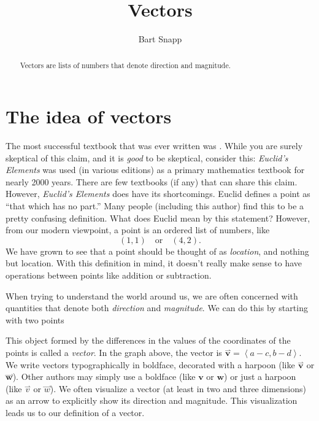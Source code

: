 \documentclass{ximera}
\author{Bart Snapp}
\title[Dig-In:]{Vectors}
\begin{document}
\begin{abstract}
  Vectors are lists of numbers that denote direction and magnitude.
\end{abstract}
\maketitle


\section{The idea of vectors}

The most successful textbook that was ever written was
. While
you are surely skeptical of this claim, and it is \textit{good} to be
skeptical, consider this: \textit{Euclid's Elements} was used (in
various editions) as a primary mathematics textbook for nearly 2000
years. There are few textbooks (if any) that can share this
claim. However, \textit{Euclid's Elements} does have its shortcomings. 
Euclid defines a point as ``that which has no part.'' Many people 
(including this author) find this to be 
a pretty confusing definition. What does Euclid mean by this statement? 
However, from our modern viewpoint, a point is an
ordered list of numbers, like
\[
(1,1)\quad\text{or}\quad(4,2).
\]
We have grown to see that a point should be thought of as
\textit{location}, and nothing but location. With this definition in mind, it
doesn't really make sense to have operations between points like
addition or subtraction.

When trying to understand the world around us, we are often concerned
with quantities that denote both \textit{direction} and
\textit{magnitude}. We can do this by starting with two points










This object formed by the differences in the values of the coordinates of the points is 
called a \textit{vector}. In the graph above, the vector is
$\overset{\rightharpoonup}{\mathbf{v}}=\left\langle a-c,b-d \right\rangle$. We write vectors typographically in
boldface, decorated with a harpoon (like $\overset{\rightharpoonup}{\mathbf{v}}$ or
$\overset{\rightharpoonup}{\mathbf{w}}$). Other authors may simply use a boldface (like
$\mathbf{v}$ or $\mathbf{w}$) or just a harpoon (like ${\overset{\rightharpoonup}{v}}$
or ${\overset{\rightharpoonup}{w}}$). We often visualize a vector (at least in two and
three dimensions) as an arrow to explicitly show its direction and
magnitude. This visualization leads us to our definition of a vector.
\end{document}
